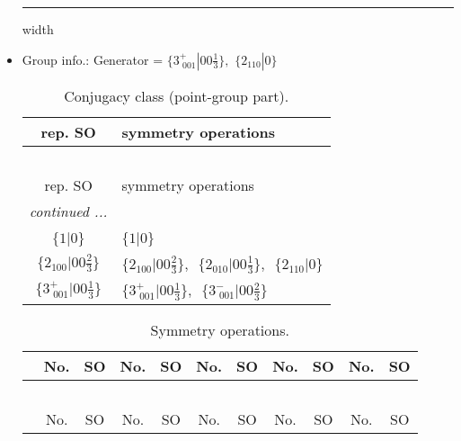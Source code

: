 \documentclass[fleqn,10pt,landscape]{article}
\begin{document}
\begin{itemize}
 \hfil \hrule height 1mm width \textwidth \hfil

\item Group info.: Generator = $\{3^{+}_{\,\,001}|0 0 \frac{1}{3}\},\,\,\{2{}_{110}|0\}$

\begin{center}
\renewcommand{\arraystretch}{1.3}
\begin{longtable}{c|l}
\caption{Conjugacy class (point-group part).}
 \\
 \hline \hline
rep. SO & symmetry operations \\ \hline \endfirsthead

\multicolumn{1}{l}{\tablename\ \thetable{}} \\
 \hline \hline
rep. SO & symmetry operations \\ \hline \endhead

 \hline \hline
\multicolumn{1}{r}{\footnotesize\it continued ...} \\ \endfoot

 \hline \hline
\multicolumn{1}{r}{} \\ \endlastfoot

$\{1|0\}$ & $\{1|0\}$ \\ \hline
$\{2{}_{100}|0 0 \frac{2}{3}\}$ & $\{2{}_{100}|0 0 \frac{2}{3}\}$,\,\, $\{2{}_{010}|0 0 \frac{1}{3}\}$,\,\, $\{2{}_{110}|0\}$ \\ \hline
$\{3^{+}_{\,\,001}|0 0 \frac{1}{3}\}$ & $\{3^{+}_{\,\,001}|0 0 \frac{1}{3}\}$,\,\, $\{3^{-}_{\,\,001}|0 0 \frac{2}{3}\}$ \\
\end{longtable}
\end{center}
\begin{center}
\renewcommand{\arraystretch}{1.3}
\begin{longtable}{c|cc|cc|cc|cc|cc}
\caption{Symmetry operations.}
 \\
 \hline \hline
 & No. & SO & No. & SO & No. & SO & No. & SO & No. & SO \\ \hline \endfirsthead

\multicolumn{10}{l}{\tablename\ \thetable{}} \\
 \hline \hline
 & No. & SO & No. & SO & No. & SO & No. & SO & No. & SO \\ \hline \endhead


\end{longtable}
\end{center}
\end{itemize}
\end{document}
